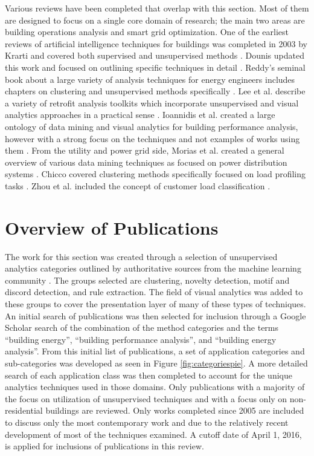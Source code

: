 Various reviews have been completed that overlap with this section. Most of them are designed to focus on a single core domain of research; the main two areas are building operations analysis and smart grid optimization. One of the earliest reviews of artificial intelligence techniques for buildings was completed in 2003 by Krarti and covered both supervised and unsupervised methods \citep{krarti_overview_2003}. Dounis updated this work and focused on outlining specific techniques in detail \citep{dounis_artificial_2010}.  Reddy's seminal book about a large variety of analysis techniques for energy engineers includes chapters on clustering and unsupervised methods specifically \citep{reddy_applied_2011}. Lee et al. describe a variety of retrofit analysis toolkits which incorporate unsupervised and visual analytics approaches in a practical sense \citep{lee_energy_2015}. Ioannidis et al. created a large ontology of data mining and visual analytics for building performance analysis, however with a strong focus on the techniques and not examples of works using them \citep{ioannidis_big_2015}. From the utility and power grid side, Morias et al. created a general overview of various data mining techniques as focused on power distribution systems \citep{morais_overview_2009}. Chicco covered clustering methods specifically focused on load profiling tasks \citep{chicco_overview_2012}. Zhou et al. included the concept of customer load classification  \citep{zhou_review_2013}.\\

\section{Overview of Publications}
\label{Overview}
The work for this section was created through a selection of unsupervised analytics categories outlined by authoritative sources from the machine learning community \citep{hastie_elements_2009,james_introduction_2013,duda_pattern_2012,mirkin_clustering:_2012}. The groups selected are clustering, novelty detection, motif and discord detection, and rule extraction. The field of visual analytics was added to these groups to cover the presentation layer of many of these types of techniques. An initial search of publications was then selected for inclusion through a Google Scholar search of the combination of the method categories and the terms ``building energy'', ``building performance analysis'', and ``building energy analysis''. From this initial list of publications, a set of application categories and sub-categories was developed as seen in Figure \ref{fig:categoriespie}. A more detailed search of each application class was then completed to account for the unique analytics techniques used in those domains. Only publications with a majority of the focus on utilization of unsupervised techniques and with a focus only on non-residential buildings are reviewed. Only works completed since 2005 are included to discuss only the most contemporary work and due to the relatively recent development of most of the techniques examined. A cutoff date of April 1, 2016, is applied for inclusions of publications in this review.


